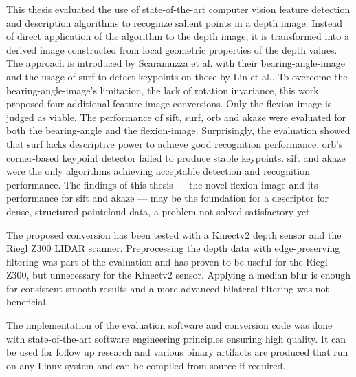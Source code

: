 This thesis evaluated the use of state-of-the-art computer vision feature detection and description algorithms to recognize salient points in a depth image.
Instead of direct application of the algorithm to the depth image, it is transformed into a derived image constructed from local geometric properties of the depth values.
The approach is introduced by Scaramuzza et al.\cite{scaramuzza_iros2007} with their \gls{bearing-angle-image} and the usage of \acrshort{surf} to detect keypoints on those by Lin et al.\cite{lin_easp2017}.
To overcome the \gls{bearing-angle-image}'s limitation, the lack of rotation invariance, this work proposed four additional feature image conversions.
Only the \gls{flexion-image} is judged as viable.
The performance of \acrshort{sift}, \acrshort{surf}, \acrshort{orb} and \acrshort{akaze} were evaluated for both the \gls{bearing-angle} and the \gls{flexion-image}.
Surprisingly, the evaluation showed that \acrshort{surf} lacks descriptive power to achieve good recognition performance.
\acrshort{orb}'s corner-based keypoint detector failed to produce stable keypoints.
\acrshort{sift} and \acrshort{akaze} were the only algorithms achieving acceptable detection and recognition performance.
The findings of this thesis --- the novel \gls{flexion-image} and its performance for \acrshort{sift} and \acrshort{akaze} --- may be the foundation for a descriptor for dense, structured pointcloud data, a problem not solved satisfactory yet.

The proposed conversion has been tested with a Kinectv2 depth sensor and the Riegl Z300 \acrshort{LIDAR} scanner.
Preprocessing the depth data with edge-preserving filtering was part of the evaluation and has proven to be useful for the Riegl Z300, but unnecessary for the Kinectv2 sensor.
Applying a median blur is enough for consistent smooth results and a more advanced bilateral filtering was not beneficial.

The implementation of the evaluation software and conversion code was done with state-of-the-art software engineering principles ensuring high quality.
It can be used for follow up research and various binary artifacts are produced that run on any Linux system and can be compiled from source if required.
